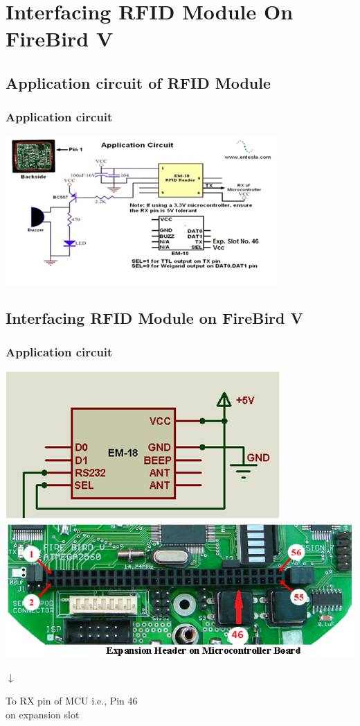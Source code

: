 \documentclass[table,10pt,red]{beamer}	%
\begin{document}
\section{Interfacing RFID Module On FireBird V} %
\subsection{Application circuit of RFID Module}
\begin{frame}
	\frametitle{Application circuit}

				\includegraphics[scale=1]{rfidapp}
		
\end{frame}


\subsection{Interfacing RFID Module on FireBird V}
\begin{frame}
	\frametitle{Application circuit}

				\includegraphics[scale=0.25]{rfidckt}
				\hspace{0.2in}\includegraphics[scale=0.29]{exp}
				
			\hspace{0.06in}	$\downarrow$
		
			To RX pin of MCU i.e., Pin 46\\on expansion slot
		
\end{frame}
\end{document}
